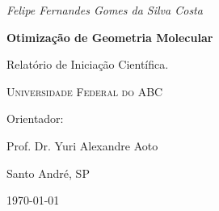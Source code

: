 \thispagestyle{empty}

\begin{center}
	{\Large\itshape Felipe Fernandes Gomes da Silva Costa \par}
	\vspace{3cm}
	{\LARGE \bfseries Otimização de Geometria Molecular \par}
	\vspace{3cm}
	\begin{flushright}
		\begin{minipage}[c]{.6\textwidth}
			Relatório de Iniciação Científica.
		\end{minipage}
	\end{flushright}
		
	\vspace{3cm}
	{\scshape\Large Universidade Federal do ABC \par}
	\vfill
	{\Large Orientador: \par Prof. Dr. Yuri Alexandre Aoto}
	
	\vfill
	
	{\large Santo André, SP \par}	
	{\large \today \par}
	
\end{center}

